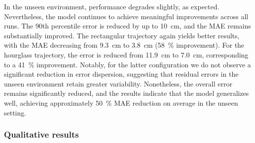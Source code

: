 In the unseen environment, performance degrades slightly, as expected. Nevertheless, the model continues to achieve meaningful improvements across all runs. The 90th percentile error is reduced by up to \SI{10}{\centi\metre}, and the MAE remains substantially improved. The rectangular trajectory again yields better results, with the MAE decreasing from \SI{9.3}{\centi\metre} to \SI{3.8}{\centi\metre} (\SI{58}{\percent} improvement). For the hourglass trajectory, the error is reduced from \SI{11.9}{\centi\metre} to \SI{7.0}{\centi\metre}, corresponding to a \SI{41}{\percent} improvement. Notably, for the latter configuration we do not observe a significant reduction in error dispersion, suggesting that residual errors in the unseen environment retain greater variability. Nonetheless, the overall error remains significantly reduced, and the results indicate that the model generalizes well, achieving approximately \SI{50}{\percent} MAE reduction on average in the unseen setting.

\subsubsection{Qualitative results}




